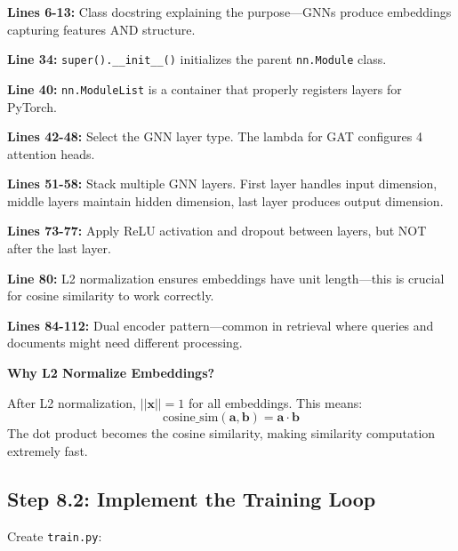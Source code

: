 \documentclass[12pt,a4paper]{article}
\begin{document}
\begin{explanation}
\textbf{Lines 6-13:} Class docstring explaining the purpose---GNNs produce embeddings capturing features AND structure.

\textbf{Line 34:} \texttt{super().\_\_init\_\_()} initializes the parent \texttt{nn.Module} class.

\textbf{Line 40:} \texttt{nn.ModuleList} is a container that properly registers layers for PyTorch.

\textbf{Lines 42-48:} Select the GNN layer type. The lambda for GAT configures 4 attention heads.

\textbf{Lines 51-58:} Stack multiple GNN layers. First layer handles input dimension, middle layers maintain hidden dimension, last layer produces output dimension.

\textbf{Lines 73-77:} Apply ReLU activation and dropout between layers, but NOT after the last layer.

\textbf{Line 80:} L2 normalization ensures embeddings have unit length---this is crucial for cosine similarity to work correctly.

\textbf{Lines 84-112:} Dual encoder pattern---common in retrieval where queries and documents might need different processing.
\end{explanation}

\begin{concept}
\textbf{Why L2 Normalize Embeddings?}

After L2 normalization, $||\mathbf{x}|| = 1$ for all embeddings. This means:
\[
\text{cosine\_sim}(\mathbf{a}, \mathbf{b}) = \mathbf{a} \cdot \mathbf{b}
\]
The dot product becomes the cosine similarity, making similarity computation extremely fast.
\end{concept}

\subsection{Step 8.2: Implement the Training Loop}

Create \texttt{train.py}:
\end{document}

